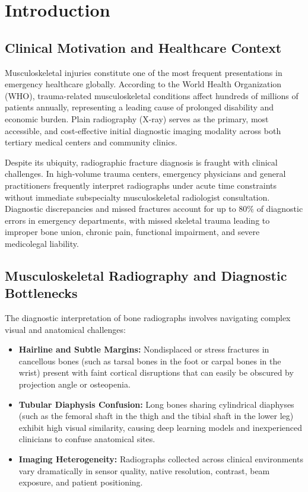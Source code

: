 \documentclass[12pt, a4paper]{report}
\begin{document}
\newpage
\chapter{Introduction}

\section{Clinical Motivation and Healthcare Context}
Musculoskeletal injuries constitute one of the most frequent presentations in emergency healthcare globally. According to the World Health Organization (WHO), trauma-related musculoskeletal conditions affect hundreds of millions of patients annually, representing a leading cause of prolonged disability and economic burden. Plain radiography (X-ray) serves as the primary, most accessible, and cost-effective initial diagnostic imaging modality across both tertiary medical centers and community clinics.

Despite its ubiquity, radiographic fracture diagnosis is fraught with clinical challenges. In high-volume trauma centers, emergency physicians and general practitioners frequently interpret radiographs under acute time constraints without immediate subspecialty musculoskeletal radiologist consultation. Diagnostic discrepancies and missed fractures account for up to 80\% of diagnostic errors in emergency departments, with missed skeletal trauma leading to improper bone union, chronic pain, functional impairment, and severe medicolegal liability.

\section{Musculoskeletal Radiography and Diagnostic Bottlenecks}
The diagnostic interpretation of bone radiographs involves navigating complex visual and anatomical challenges:
\begin{itemize}[leftmargin=*]
    \item \textbf{Hairline and Subtle Margins:} Nondisplaced or stress fractures in cancellous bones (such as tarsal bones in the foot or carpal bones in the wrist) present with faint cortical disruptions that can easily be obscured by projection angle or osteopenia.
    \item \textbf{Tubular Diaphysis Confusion:} Long bones sharing cylindrical diaphyses (such as the femoral shaft in the thigh and the tibial shaft in the lower leg) exhibit high visual similarity, causing deep learning models and inexperienced clinicians to confuse anatomical sites.
    \item \textbf{Imaging Heterogeneity:} Radiographs collected across clinical environments vary dramatically in sensor quality, native resolution, contrast, beam exposure, and patient positioning.
\end{itemize}
\end{document}
